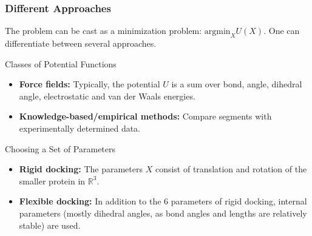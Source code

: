 \documentclass{beamer}
\begin{document}
\begin{frame}
\begin{columns}
{\begin{figure}
\end{figure}
}
\end{columns}

\end{frame}


\begin{frame}
\frametitle{Different Approaches}
The problem can be cast as a minimization problem: $\text{argmin}_{X} U(X)$. One can differentiate between several approaches.
\begin{block}{Classes of Potential Functions}
\begin{itemize}
	\item \textbf{Force fields:} Typically, the potential $U$ is a sum over bond, angle, dihedral angle, electrostatic and van der Waals energies.
	\item \textbf{Knowledge-based/empirical methods:} Compare segments with experimentally determined data.
\end{itemize}
\end{block}

\begin{block}{Choosing a Set of Parameters}
\begin{itemize}
	\item \textbf{Rigid docking:} The parameters $X$ consist of translation and rotation of the smaller protein in $\mathbb R^3$.
	\item \textbf{Flexible docking:} In addition to the 6 parameters of rigid docking, internal parameters (mostly dihedral angles, as bond angles and lengths are relatively stable) are used.
\end{itemize}
\end{block}

\end{frame}

\end{document}
